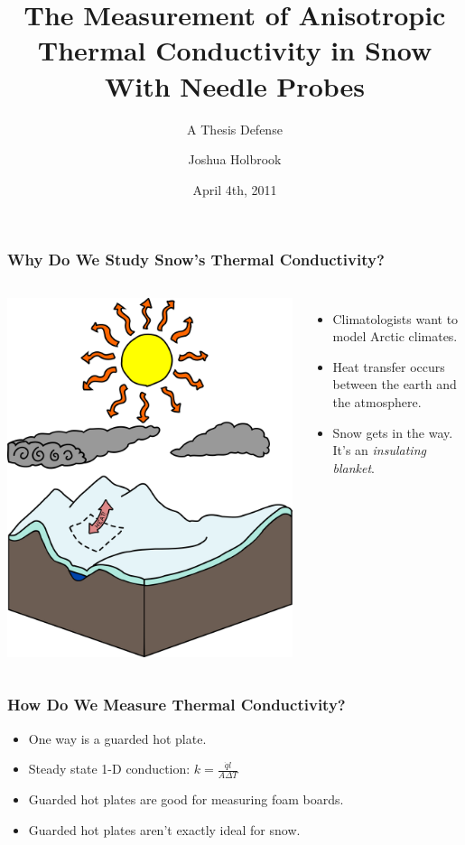 \documentclass{beamer}
\title{The Measurement of Anisotropic Thermal Conductivity in Snow With Needle Probes}
\subtitle{A Thesis Defense}
\author{Joshua Holbrook}
\date{April 4th, 2011}
\begin{document}
\frame{\titlepage}


\begin{frame}
\frametitle{Why Do We Study Snow's Thermal Conductivity?}
\begin{columns}[c]
     \includegraphics[width=\textwidth]{fig/climate.png}
    \begin{itemize}
    \item Climatologists want to model Arctic climates.
    \item Heat transfer occurs between the earth and the atmosphere.
    \item Snow gets in the way. It's an \emph{insulating blanket}.
    \end{itemize}
\end{columns}
\end{frame}


\begin{frame}
\frametitle{How Do We Measure Thermal Conductivity?}
    \begin{itemize}
    \item One way is a guarded hot plate.
    \item Steady state 1-D conduction: \(k = \frac{\dot{q}l}{A\Delta T}\)
    \item Guarded hot plates are good for measuring foam boards.
    \item Guarded hot plates aren't exactly ideal for snow.
    \end{itemize}
\end{frame}
\end{document}
